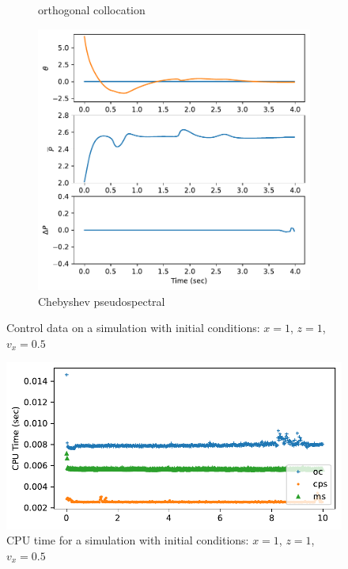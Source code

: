 \documentclass[]{article}
\begin{document}
\begin{figure}[H]
\begin{subfigure}[b]{0.3\textwidth}
		\caption{orthogonal collocation}
	\end{subfigure}%
	\begin{subfigure}[b]{0.3\textwidth}
		\centering
		\includegraphics[width=\textwidth]{figures/controlx1z1vx5.pdf}
		\caption{Chebyshev pseudospectral}
	\end{subfigure}
	\caption{Control data on a simulation with initial conditions: $x = 1$, $z=1$, $v_x = 0.5$}
	\label{fig:controlx1z1vx}
\end{figure}


\begin{figure}[H]
	\centering
	\includegraphics[width=\textwidth]{figures/time45dz.pdf}
	\caption{CPU time for a simulation with initial conditions: $x = 1$, $z=1$, $v_x = 0.5$}
	\label{fig:timex1z1vx}
\end{figure}
\end{document}
